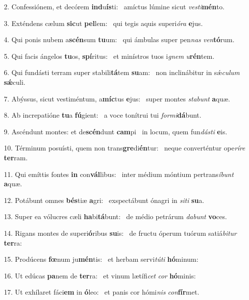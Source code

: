 2. Confessiónem, et decórem \textbf{ind}u\textbf{ís}ti: \ast\  amíctus lúmine sicut \textit{ves}\textit{ti}\textbf{mén}to.\

3. Exténdens cælum \textbf{sic}ut \textbf{pel}lem: \ast\  qui tegis aquis superi\textit{ó}\textit{ra} \textbf{e}jus.\

4. Qui ponis nubem a\textbf{scén}sum \textbf{tu}um: \ast\  qui ámbulas super pen\textit{nas} \textit{ven}\textbf{tó}rum.\

5. Qui facis ángelos \textbf{tu}os, \textbf{spí}ritus: \ast\  et minístros tuos i\textit{gnem} \textit{u}\textbf{rén}tem.\

6. Qui fundásti terram super stabili\textbf{tá}tem \textbf{su}am: \ast\  non inclinábitur in sǽ\textit{cu}\textit{lum} \textbf{sǽ}culi.\

7. Abýssus, sicut vestiméntum, a\textbf{míc}tus \textbf{e}jus: \ast\  super montes \textit{sta}\textit{bunt} \textbf{a}quæ.\

8. Ab increpatióne \textbf{tu}a \textbf{fú}gient: \ast\  a voce tonítrui tui \textit{for}\textit{mi}\textbf{dá}bunt.\

9. Ascéndunt montes: et de\textbf{scén}dunt \textbf{cam}pi \ast\  in locum, quem fun\textit{dás}\textit{ti} \textbf{e}is.\

10. Términum posuísti, quem non trans\textbf{gre}di\textbf{én}tur: \ast\  neque converténtur ope\textit{rí}\textit{re} \textbf{ter}ram.\

11. Qui emíttis fontes \textbf{in} con\textbf{vál}libus: \ast\  inter médium móntium pertrans\textit{í}\textit{bunt} \textbf{a}quæ.\

12. Potábunt omnes \textbf{bés}tiæ \textbf{a}gri: \ast\  exspectábunt ónagri in \textit{si}\textit{ti} \textbf{su}a.\

13. Super ea vólucres cæli \textbf{ha}bi\textbf{tá}bunt: \ast\  de médio petrárum \textit{da}\textit{bunt} \textbf{vo}ces.\

14. Rigans montes de superi\textbf{ó}ribus \textbf{su}is: \ast\  de fructu óperum tuórum satiá\textit{bi}\textit{tur} \textbf{ter}ra:\

15. Prodúcens \textbf{fœ}num ju\textbf{mén}tis: \ast\  et herbam servi\textit{tú}\textit{ti} \textbf{hó}minum:\

16. Ut edúcas \textbf{pa}nem de \textbf{ter}ra: \ast\  et vinum lætífi\textit{cet} \textit{cor} \textbf{hó}minis:\

17. Ut exhílaret fáci\textbf{em} in \textbf{ó}leo: \ast\  et panis cor hómi\textit{nis} \textit{con}\textbf{fír}met.\

